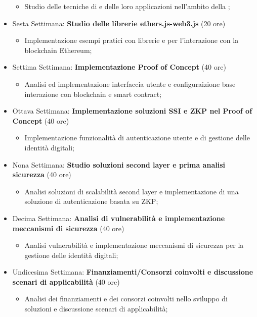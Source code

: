 \begin{itemize}
    \begin{itemize}
        \item Studio delle tecniche di  e delle loro applicazioni nell'ambito della ;
    \end{itemize}
    \item{Sesta Settimana: \textbf{Studio delle librerie ethers.js-web3.js} (20 ore)}
    \begin{itemize}
        \item Implementazione esempi pratici con librerie  e  per l'interazione con la blockchain Ethereum;
    \end{itemize}
    \item{Settima Settimana: \textbf{Implementazione Proof of Concept} (40 ore)}
    \begin{itemize}
        \item Analisi ed implementazione interfaccia utente e configuraizione base interazione con blockchain e smart contract;
    \end{itemize}
    \item{Ottava Settimana: \textbf{Implementazione soluzioni SSI e ZKP nel Proof of Concept} (40 ore)}
    \begin{itemize}
        \item Implementazione funzionalità di autenticazione utente e di gestione delle identità digitali;
    \end{itemize}
    \item{Nona Settimana: \textbf{Studio soluzioni second layer e prima analisi sicurezza} (40 ore)}
    \begin{itemize}
        \item Analisi soluzioni di scalabilità second layer e implementazione di una soluzione di autenticazione basata su ZKP;
    \end{itemize}
    \item{Decima Settimana: \textbf{Analisi di vulnerabilità e implementazione meccanismi di sicurezza} (40 ore)}
    \begin{itemize}
        \item Analisi vulnerabilità e implementazione meccanismi di sicurezza per la gestione delle identità digitali;
    \end{itemize}
    \item{Undicesima Settimana: \textbf{Finanziamenti/Consorzi coinvolti e discussione scenari di applicabilità} (40 ore)}
    \begin{itemize}
        \item Analisi dei finanziamenti e dei consorzi coinvolti nello sviluppo di soluzioni  e discussione scenari di applicabilità;
    \end{itemize}
\end{itemize}